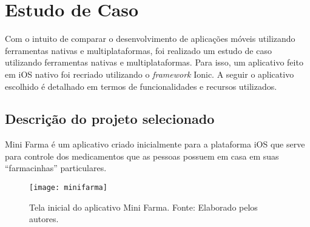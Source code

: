 \chapter{Estudo de Caso} \label{cap:estudodecaso}

Com o intuito de comparar o desenvolvimento de aplicações móveis utilizando ferramentas nativas e multiplataformas, foi realizado um estudo de caso  utilizando ferramentas nativas e multiplataformas. Para isso, um aplicativo feito em iOS 
nativo foi recriado utilizando o \textit{framework} Ionic. A seguir o aplicativo escolhido é detalhado em termos de funcionalidades e recursos utilizados. 

\section{Descrição do projeto selecionado} \label{sec:descricaodoprojeto}

Mini Farma é um aplicativo criado inicialmente para a plataforma iOS que serve para controle dos medicamentos que as 
pessoas possuem em casa em suas ``farmacinhas'' particulares.

\begin{figure}[h]
  \centering
    \texttt{[image: minifarma]}
    \caption[Tela inicial do aplicativo Mini Farma]{ Tela inicial do aplicativo Mini Farma. Fonte: Elaborado pelos autores.}
	\label{fig:minifarma}
\end{figure}


